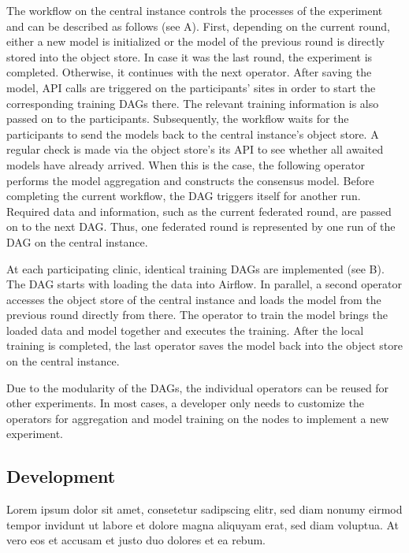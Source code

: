 The workflow on the central instance controls the processes of the experiment and can be described as follows (see  A).
First, depending on the current round, either a new model is initialized  or the model of the previous round is directly stored into the object store.
In case it was the last round, the experiment is completed. Otherwise, it continues with the next operator.
After saving the model, API calls are triggered on the participants' sites in order to start the corresponding training DAGs there. The relevant training information is also passed on to the participants. Subsequently, the workflow waits for the participants to send the models back to the central instance's object store. A regular check is made via the object store's its API to see whether all awaited models have already arrived.
When this is the case, the following operator performs the model aggregation and constructs the consensus model.
Before completing the current workflow, the DAG triggers itself for another run. Required data and information, such as the current federated round, are passed on to the next DAG. Thus, one federated round is represented by one run of the DAG on the central instance.

At each participating clinic, identical training DAGs are implemented (see  B).
The DAG starts with loading the data into Airflow. In parallel, a second operator accesses the object store of the central instance and loads the model from the previous round directly from there.
The operator to train the model brings the loaded data and model together and executes the training. After the local training is completed, the last operator saves the model back into the object store on the central instance.

Due to the modularity of the DAGs, the individual operators can be reused for other experiments. In most cases, a developer only needs to customize the operators for aggregation and model training on the nodes to implement a new experiment.


\subsection{Development}
\label{subsec:Development}
Lorem ipsum dolor sit amet, consetetur sadipscing elitr, sed diam nonumy eirmod tempor invidunt ut labore et dolore magna aliquyam erat, sed diam voluptua. At vero eos et accusam et justo duo dolores et ea rebum. 


